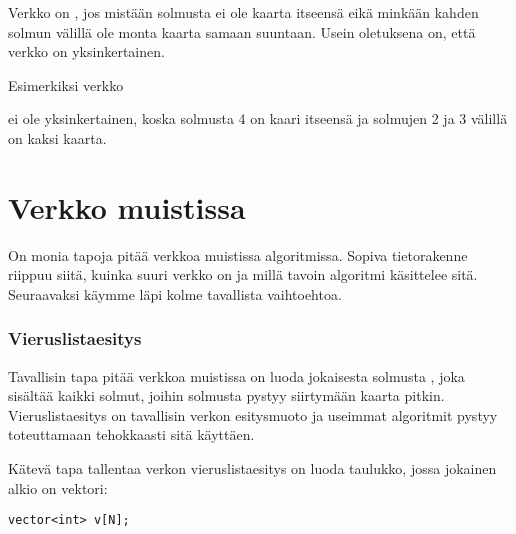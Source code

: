 Verkko on ,
jos mistään solmusta ei ole kaarta itseensä
eikä minkään kahden solmun välillä ole
monta kaarta samaan suuntaan.
Usein oletuksena on, että verkko on yksinkertainen.

Esimerkiksi verkko
\begin{center}
\end{center}
ei ole yksinkertainen, koska solmusta 4 on kaari itseensä
ja solmujen 2 ja 3 välillä on kaksi kaarta.

\section{Verkko muistissa}

On monia tapoja pitää verkkoa muistissa algoritmissa.
Sopiva tietorakenne riippuu siitä,
kuinka suuri verkko on ja
millä tavoin algoritmi käsittelee sitä.
Seuraavaksi käymme läpi kolme tavallista vaihtoehtoa.

\subsubsection{Vieruslistaesitys}


Tavallisin tapa pitää verkkoa muistissa on
luoda jokaisesta solmusta ,
joka sisältää kaikki solmut,
joihin solmusta pystyy siirtymään kaarta pitkin.
Vieruslistaesitys on tavallisin verkon esitysmuoto ja
useimmat algoritmit pystyy toteuttamaan
tehokkaasti sitä käyttäen.

Kätevä tapa tallentaa verkon vieruslistaesitys on luoda taulukko,
jossa jokainen alkio on vektori:

\begin{lstlisting}
vector<int> v[N];
\end{lstlisting}

